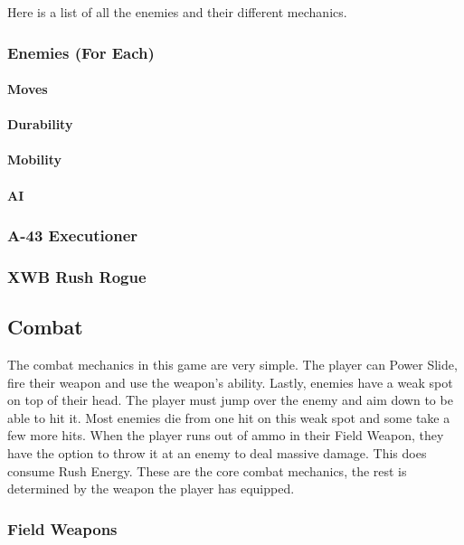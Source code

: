 \documentclass[12pt]{article}
\begin{document}
Here is a list of all the enemies and their different mechanics. 

\subsubsection{Enemies (For Each)}

\paragraph{Moves}

\paragraph{Durability}

\paragraph{Mobility}

\paragraph{AI}

\subsubsection{A-43 Executioner}

\subsubsection{XWB Rush Rogue}



\subsection{Combat}

The combat mechanics in this game are very simple. The player can Power Slide, fire their weapon and use the weapon's ability. Lastly, enemies have a weak spot on top of their head. The player must jump over the enemy and aim down to be able to hit it. Most enemies die from one hit on this weak spot and some take a few more hits. When the player runs out of ammo in their Field Weapon, they have the option to throw it at an enemy to deal massive damage. This does consume Rush Energy.
These are the core combat mechanics, the rest is determined by the weapon the player has equipped.

\subsubsection{Field Weapons}
\end{document}
